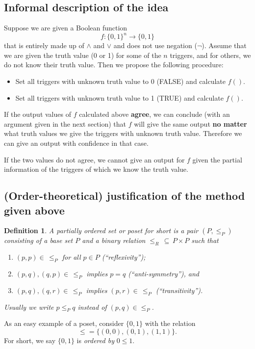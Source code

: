 \documentclass[12pt]{amsart}
\newtheorem{definition}[lemma]{\bf Definition}
\begin{document}
\subsection{Informal description of the idea} 
Suppose we are given a Boolean function
$$f: \{0,1\}^n\to\{0,1\}$$
that is entirely made up of $\land$ and $\lor$ and does not use 
negation ($\neg$). Assume that 
we are given the truth value (0 or 1) for some 
of the $n$ triggers, and for others, we do not know their truth
value. 
Then we propose the following procedure:
\begin{itemize}
\item Set all triggers with unknown truth value to 0 (FALSE) and 
calculate $f()$.
\item Set all triggers with unknown truth value to 1 (TRUE) and 
calculate $f()$.
\end{itemize}
If the output values of $f$ calculated above {\bf agree}, we can conclude 
(with an argument given in  the 
next section) that $f$ will give the same output {\bf no matter} what
truth values we give the triggers with unknown truth value. Therefore 
we can give an output with confidence in that case.

If the two values do not agree, we cannot give an output for $f$ given 
the partial information of the triggers of which we know the truth value.
\subsection{(Order-theoretical) justification of the method given above}
\begin{definition} A {\em partially ordered set} or {\em poset} for short 
is a pair $(P,\leq_P)$ consisting of a base set $P$ and a binary relation 
$\leq_R \,  \subseteq \, P\times P$ such that 
\begin{enumerate}
    \item $(p,p)\in \,\leq_P$ for all $p\in P$ (``reflexivity'');
    \item $(p,q), (q,p) \in \, \leq_P$ implies $p=q$ (``anti-symmetry''), and 
    \item $(p,q), (q,r)\in \, \leq_P$ implies $(p,r)\in \, \leq_P$ (``transitivity'').
\end{enumerate}
Usually we write $p \leq_P q$ instead of $(p,q)\in\leq_P$.
\end{definition}

As an easy example of a poset, consider $\{0,1\}$ with the relation 
$$\leq = \{(0,0), (0,1), (1,1)\}.$$ For short, we say $\{0,1\}$ is 
{\em ordered by} $0\leq 1$.
\end{document}
